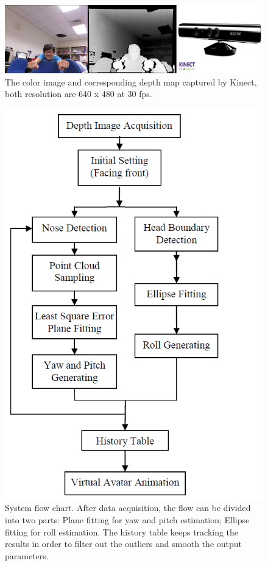 \begin{figure}
\includegraphics[width=1.0\linewidth]{./fig2.png}
\caption{The color image and corresponding depth map captured by Kinect, both resolution are 640 x 480 at 30 fps.}
\label{fig:2}       %
\end{figure}

\begin{figure}
\includegraphics[width=1.0\linewidth]{./fig4.png}
\caption{System flow chart. After data acquisition, the flow can be divided into two parts: Plane fitting for yaw and pitch estimation; Ellipse fitting for roll estimation. The history table keeps tracking the results in order to filter out the outliers and smooth the output parameters.}
\label{fig:4}       %
\end{figure}


